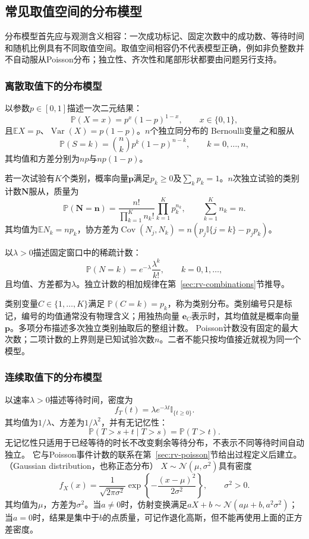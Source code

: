 \subsection{常见取值空间的分布模型}
\label{sec:probability-common-distributions}
\label{sec:probability-families-transformations}
分布模型首先应与观测含义相容：一次成功标记、固定次数中的成功数、等待时间和随机比例具有不同取值空间。取值空间相容仍不代表模型正确，例如非负整数并不自动服从Poisson分布；独立性、齐次性和尾部形状都要由问题另行支持。

\subsubsection{离散取值下的分布模型}
以参数\(p\in[0,1]\)描述一次二元结果：
\[ \mathbb{P}(X=x)=p^x(1-p)^{1-x},
  \qquad x\in\{0,1\}, \]
且\(\mathbb{E}X=p\)、\(\operatorname{Var}(X)=p(1-p)\)。\(n\)个独立同分布的
Bernoulli变量之和服从
\[ \mathbb{P}(S=k)
  =\binom{n}{k}p^k(1-p)^{n-k},\qquad k=0,\ldots,n, \]
其均值和方差分别为\(np\)与\(np(1-p)\)。

若一次试验有\(K\)个类别，概率向量\(\bm{p}\)满足\(p_k\geq0\)及\(\sum_kp_k=1\)。\(n\)次独立试验的类别计数\(\bm{N}\)服从，质量为
\[ \mathbb{P}(\bm{N}=\bm{n})
  =\frac{n!}{\prod_{k=1}^{K}n_k!}\prod_{k=1}^{K}p_k^{n_k},\qquad\sum_{k=1}^{K}n_k=n. \]
其均值为\(\mathbb{E}N_k=np_k\)，协方差为\(\operatorname{Cov}(N_j,N_k)=n(p_j\mathbb{I}\{j=k\}-p_jp_k)\)。

以\(\lambda>0\)描述固定窗口中的稀疏计数：
\[ \mathbb{P}(N=k)
  =e^{-\lambda}\frac{\lambda^k}{k!},\qquad k=0,1,\ldots, \]
且均值、方差都为\(\lambda\)。独立计数的相加规律在第~\ref{sec:rv-combinations}节推导。

类别变量\(C\in\{1,\ldots,K\}\)满足
\(\mathbb P(C=k)=p_k\)，称为类别分布。类别编号只是标记，编号的均值通常没有物理含义；用独热向量
\(\bm e_C\)表示时，其均值就是概率向量\(\bm p\)。多项分布描述多次独立类别抽取后的整组计数。
Poisson计数没有固定的最大次数；二项计数的上界则是已知试验次数\(n\)。二者不能只按均值接近就视为同一个模型。

\subsubsection{连续取值下的分布模型}
以速率\(\lambda>0\)描述等待时间，密度为
\[
f_T(t)=\lambda e^{-\lambda t}\mathbb I_{\{t\geq0\}}.
\]
其均值为\(1/\lambda\)、方差为\(1/\lambda^2\)，并有无记忆性：
\[ \mathbb{P}(T>s+t\mid T>s)=\mathbb{P}(T>t). \]
无记忆性只适用于已经等待的时长不改变剩余等待分布，不表示不同等待时间自动独立。
它与Poisson事件计数的联系在第~\ref{sec:rv-poisson}节给出过程定义后建立。
（Gaussian distribution，也称正态分布）
\(X\sim\mathcal{N}(\mu,\sigma^2)\)具有密度
\[ f_X(x)
  =\frac{1}{\sqrt{2\pi\sigma^2}}\exp\left\{-\frac{(x-\mu)^2}{2\sigma^2}\right\},\qquad \sigma^2>0. \]
其均值为\(\mu\)，方差为\(\sigma^2\)。当\(a\neq0\)时，仿射变换满足\(aX+b\sim\mathcal{N}(a\mu+b,a^2\sigma^2)\)；当\(a=0\)时，结果是集中于\(b\)的点质量，可记作退化高斯，但不能再使用上面的正方差密度。

